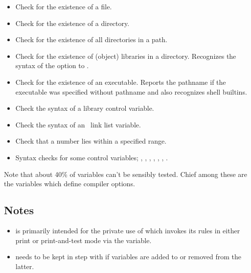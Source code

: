 \begin{itemize}
\item
   Check for the existence of a file.

\item
   Check for the existence of a directory.

\item
   Check for the existence of all directories in a path.

\item
   Check for the existence of (object) libraries in a directory.  Recognizes
   the syntax of the  option to .

\item
   Check for the existence of an executable.  Reports the pathname if the
   executable was specified without pathname and also recognizes shell
   builtins.

\item
   Check the syntax of a library control variable.

\item
   Check the syntax of an \aipspp\ link list variable.

\item
   Check that a number lies within a specified range.

\item
   Syntax checks for some control variables; , ,
   , , , ,
   .
\end{itemize}

\noindent
Note that about 40\% of  variables can't be sensibly
tested.  Chief among these are the variables which define compiler options.

\subsection*{Notes}
 
\begin{itemize}
\item
    is primarily intended for the private use of
    which invokes its rules in either print or
   print-and-test mode via the  variable.

\item
    needs to be kept in step with  if
   variables are added to or removed from the latter.
\end{itemize}

